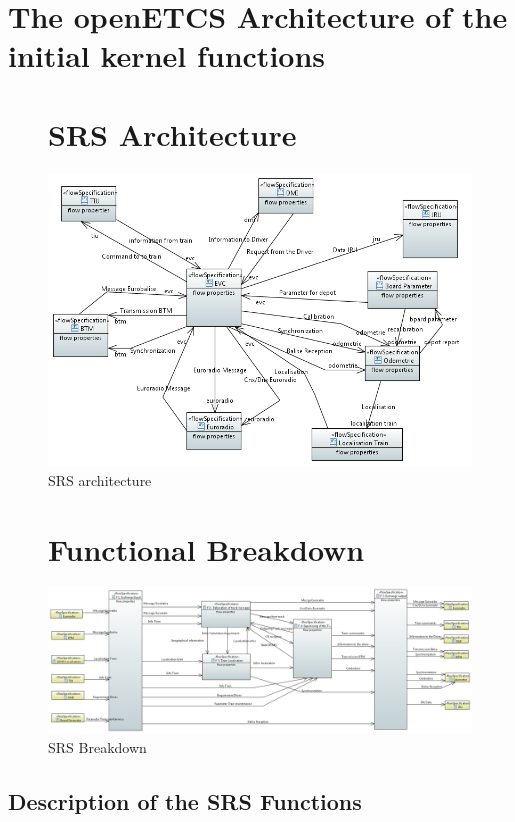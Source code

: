 \documentclass{template/openetcs_article}
\begin{document}
\section{The openETCS Architecture of the initial kernel functions}

\newpage

\begin{figure}[hbtp]
\section{SRS Architecture}
\centering
\includegraphics[scale=0.8] {images/HighLevelArchitecture.png}
\caption{SRS architecture}
\end{figure}

\begin{figure}[hbtp]
\section{Functional Breakdown}
\centering
\includegraphics [angle=90, scale=0.5] {images/HighLevelFunctionalbreakdown}
\caption{SRS Breakdown}
\end{figure}

\newpage
\subsection{Description of the SRS Functions}
\end{document}
